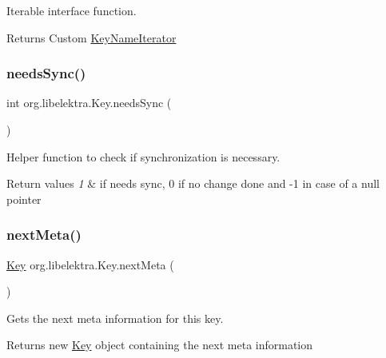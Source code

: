 Iterable interface function. 

\begin{DoxyReturn}{Returns}
Custom \hyperlink{classorg_1_1libelektra_1_1KeyNameIterator}{Key\+Name\+Iterator} 
\end{DoxyReturn}
\mbox{\label{classorg_1_1libelektra_1_1Key_a6f5afab907a28b264af0981e9db58c64}} 
\subsubsection{\texorpdfstring{needs\+Sync()}{needsSync()}}
{\footnotesize\ttfamily int org.\+libelektra.\+Key.\+needs\+Sync (\begin{DoxyParamCaption}{ }\end{DoxyParamCaption})\hspace{0.3cm}{\ttfamily [inline]}}



Helper function to check if synchronization is necessary. 


\begin{DoxyRetVals}{Return values}
{\em 1} & if needs sync, 0 if no change done and -\/1 in case of a null pointer \\
\hline
\end{DoxyRetVals}
\mbox{\label{classorg_1_1libelektra_1_1Key_ace2853c3ca003e9099272871a6d61ad6}} 
\subsubsection{\texorpdfstring{next\+Meta()}{nextMeta()}}
{\footnotesize\ttfamily \hyperlink{classorg_1_1libelektra_1_1Key}{Key} org.\+libelektra.\+Key.\+next\+Meta (\begin{DoxyParamCaption}{ }\end{DoxyParamCaption})\hspace{0.3cm}{\ttfamily [inline]}}



Gets the next meta information for this key. 

\begin{DoxyReturn}{Returns}
new \hyperlink{classorg_1_1libelektra_1_1Key}{Key} object containing the next meta information 
\end{DoxyReturn}
\mbox{\label{classorg_1_1libelektra_1_1Key_aea5c4a3a24237dca57e55beca85db0be}} 

